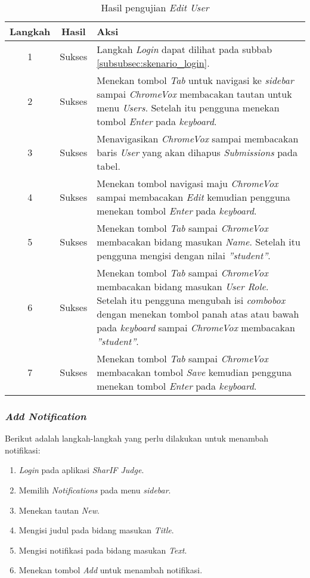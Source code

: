 \begin{table}[H]
	\centering
	\caption{Hasil pengujian \textit{Edit User}}
	\label{tab:hasil_edit_user}
	\begin{tabular}{|c|c|p{12cm}|}
		\toprule
		Langkah & Hasil & Aksi\\
		\midrule
		1 & Sukses & Langkah \textit{Login} dapat dilihat pada subbab \ref{subsubsec:skenario_login}.\\
		2 & Sukses & Menekan tombol \textit{Tab} untuk navigasi ke \textit{sidebar} sampai \textit{ChromeVox} membacakan tautan untuk menu \textit{Users}. Setelah itu pengguna menekan tombol \textit{Enter} pada \textit{keyboard}.\\
		3 & Sukses & Menavigasikan \textit{ChromeVox} sampai membacakan baris \textit{User} yang akan dihapus \textit{Submissions} pada tabel.\\
		4 & Sukses & Menekan tombol navigasi maju \textit{ChromeVox} sampai membacakan \textit{Edit} kemudian pengguna menekan tombol \textit{Enter} pada \textit{keyboard}.\\
		5 & Sukses & Menekan tombol \textit{Tab} sampai \textit{ChromeVox} membacakan bidang masukan \textit{Name}. Setelah itu pengguna mengisi dengan nilai \textit{''student''}.\\
		6 & Sukses & Menekan tombol \textit{Tab} sampai \textit{ChromeVox} membacakan bidang masukan \textit{User Role}. Setelah itu pengguna mengubah isi \textit{combobox} dengan menekan tombol panah atas atau bawah pada \textit{keyboard} sampai \textit{ChromeVox} membacakan \textit{''student''}.\\
		7 & Sukses & Menekan tombol \textit{Tab} sampai \textit{ChromeVox} membacakan tombol \textit{Save} kemudian pengguna menekan tombol \textit{Enter} pada \textit{keyboard}.\\
		\bottomrule
	\end{tabular}
\end{table}

\subsubsection{\textit{Add Notification}}
\label{subsubsec:skenario_add_notification}
Berikut adalah langkah-langkah yang perlu dilakukan untuk menambah notifikasi:

\begin{enumerate}
	\item \textit{Login} pada aplikasi \textit{SharIF Judge}.
	\item Memilih \textit{Notifications} pada menu \textit{sidebar}.
	\item Menekan tautan \textit{New}.
	\item Mengisi judul pada bidang masukan \textit{Title}.
	\item Mengisi notifikasi pada bidang masukan \textit{Text}.
	\item Menekan tombol \textit{Add} untuk menambah notifikasi.
\end{enumerate}

